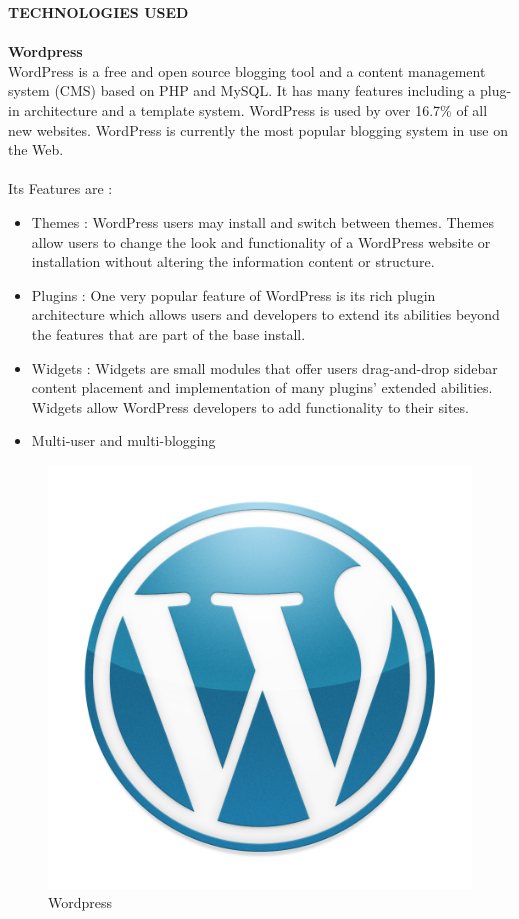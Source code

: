 {\bf TECHNOLOGIES USED}\\\\
{\bf Wordpress}\\
WordPress is a free and open source blogging tool and a content management system (CMS) based on PHP and MySQL. It has many features including a plug-in architecture and a template system. WordPress is used by over 16.7\% of all new websites. WordPress is currently the most popular blogging system in use on the Web.\\\\
Its Features are :\\
\begin{itemize}
\item Themes : WordPress users may install and switch between themes. Themes allow users to change the look and functionality of a WordPress website or installation without altering the information content or structure. 
\item Plugins : One very popular feature of WordPress is its rich plugin architecture which allows users and developers to extend its abilities beyond the features that are part of the base install.
\item Widgets : Widgets are small modules that offer users drag-and-drop sidebar content placement and implementation of many plugins' extended abilities. Widgets allow WordPress developers to add functionality to their sites.
\item Multi-user and multi-blogging
\end{itemize}
\newpage
\begin{figure}[h]
\centering \includegraphics[scale=0.2]{word.png}
\caption{Wordpress}
\end{figure}
